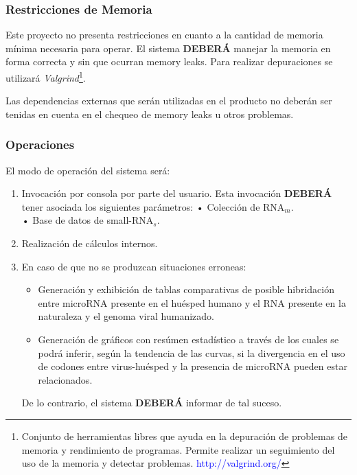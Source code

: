 \documentclass[12pt,a4paper,spanish]{article}
\begin{document}
	\subsubsection{Restricciones de Memoria}	
		\par Este proyecto no presenta restricciones en cuanto a la cantidad de memoria mínima necesaria para operar. El sistema \textbf{DEBERÁ} manejar 			la memoria en forma correcta y sin que ocurran memory leaks. Para realizar depuraciones se utilizará \textit{Valgrind}\footnote{Conjunto de 		herramientas libres que ayuda en la depuración de problemas de memoria y rendimiento de programas. Permite realizar un seguimiento del uso de la 			memoria y detectar problemas. \textcolor{blue}{http://valgrind.org/}}.
		\par Las dependencias externas que serán utilizadas en el producto no deberán ser tenidas en cuenta en el chequeo 
		de memory leaks u otros problemas.
		
	\subsubsection{Operaciones}
		El modo de operación del sistema será: 
		\begin{enumerate}
			\item Invocación por consola por parte del usuario. Esta invocación \textbf{DEBERÁ} tener asociada los siguientes parámetros: 
					\vskip 0.25cm
					\hspace*{0.75cm} • Colección de RNA$_m$. \\
					\hspace*{0.75cm} • Base de datos de small-RNA$_s$. 
			\item Realización de cálculos internos.
			\item En caso de que no se produzcan situaciones erroneas: 
				\begin{itemize}
					\item Generación y exhibición de tablas comparativas de posible hibridación entre microRNA presente en 						el huésped humano y el RNA presente en la naturaleza y el genoma viral humanizado. 
					\item Generación de gráficos con resúmen estadístico a través de los cuales se podrá inferir, según la 						tendencia de las curvas, si la divergencia en el uso de codones entre virus-huésped y la presencia de 						microRNA pueden estar relacionados.
				\end{itemize}
				De lo contrario, el sistema \textbf{DEBERÁ} informar de tal suceso.
		\end{enumerate}
\end{document}
